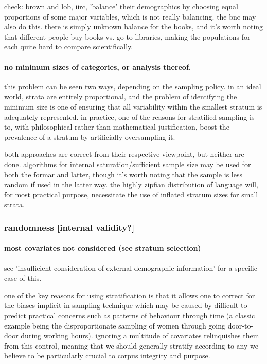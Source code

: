 check: brown and lob, iirc, 'balance' their demographics by choosing equal proportions of some major variables, which is not really balancing.  the bnc may also do this.  there is simply unknown balance for the books, and it's worth noting that different people buy books vs. go to libraries, making the populations for each quite hard to compare scientifically.



\paragraph{ no minimum sizes of categories, or analysis thereof.}
this problem can be seen two ways, depending on the sampling policy.  in an ideal world, strata are entirely proportional, and the problem of identifying the minimum size is one of ensuring that all variability within the smallest stratum is adequately represented.  in practice, one of the reasons for stratified sampling is to, with philosophical rather than mathematical justification, boost the prevalence of a stratum by artificially oversampling it.

both approaches are correct from their respective viewpoint, but neither are done.  algorithms for internal saturation/sufficient sample size may be used for both the formar and latter, though it's worth noting that the sample is less random if used in the latter way.  the highly zipfian distribution of language will, for most practical purpose, necessitate the use of inflated stratum sizes for small strata.



\subsubsection{randomness [internal validity?]}

\paragraph{ most covariates not considered (see stratum selection)}
see 'insufficient consideration of external demographic information' for a specific case of this.  

one of the key reasons for using stratification is that it allows one to correct for the biases implicit in sampling technique which may be caused by difficult-to-predict practical concerns such as patterns of behaviour through time (a classic example being the disproportionate sampling of women through going door-to-door during working hours).  ignoring a multitude of covariates relinquishes them from this control, meaning that we should generally stratify according to any we believe to be particularly crucial to corpus integrity and purpose.

